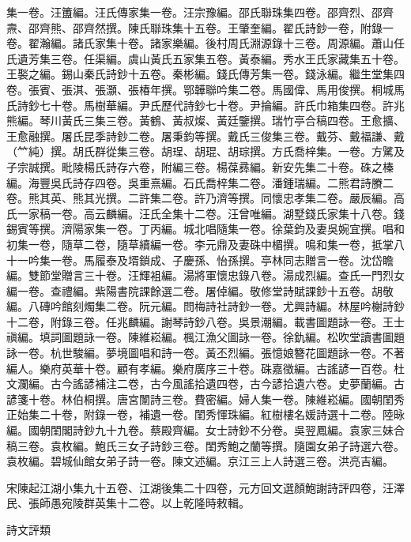 \begin{pinyinscope}
集一卷。汪簠編。汪氏傳家集一卷。汪宗豫編。邵氏聯珠集四卷。邵齊烈、邵齊燾、邵齊熊、邵齊然撰。陳氏聯珠集十五卷。王肇奎編。翟氏詩鈔一卷，附錄一卷。翟瀚編。諸氏家集十卷。諸家樂編。後村周氏淵源錄十三卷。周源編。蕭山任氏遺芳集三卷。任渠編。虞山黃氏五家集五卷。黃泰編。秀水王氏家藏集五十卷。王褧之編。錫山秦氏詩鈔十五卷。秦彬編。錢氏傳芳集一卷。錢泳編。繼生堂集四卷。張賓、張淇、張灝、張椿年撰。鄂韡聯吟集二卷。馬國偉、馬用俊撰。桐城馬氏詩鈔七十卷。馬樹華編。尹氏歷代詩鈔七十卷。尹掄編。許氏巾箱集四卷。許兆熊編。琴川黃氏三集三卷。黃鶴、黃叔燦、黃廷鑒撰。瑞竹亭合稿四卷。王愈擴、王愈融撰。屠氏昆季詩鈔二卷。屠秉鈞等撰。戴氏三俊集三卷。戴芬、戴福謙、戴（𥫗純）撰。胡氏群從集三卷。胡珵、胡琨、胡琮撰。方氏喬梓集。一卷。方騭及子宗誠撰。毗陵楊氏詩存六卷，附編三卷。楊葆彞編。新安先集二十卷。硃之榛編。海豐吳氏詩存四卷。吳重熹編。石氏喬梓集二卷。潘鍾瑞編。二熊君詩賸二卷。熊其英、熊其光撰。二許集二卷。許乃濟等撰。同懷忠孝集二卷。嚴辰編。高氏一家稿一卷。高云麟編。汪氏全集十二卷。汪曾唯編。湖墅錢氏家集十八卷。錢錫賓等撰。濟陽家集一卷。丁丙編。城北唱隨集一卷。徐葉鈞及妻吳婉宜撰。唱和初集一卷，隨草二卷，隨草續編一卷。李元鼎及妻硃中楣撰。鳴和集一卷，抵掌八十一吟集一卷。馬履泰及壻鎖成、子慶孫、怡孫撰。亭林同志贈言一卷。沈岱瞻編。雙節堂贈言三十卷。汪輝袓編。湯將軍懷忠錄八卷。湯成烈編。查氏一門烈女編一卷。查禮編。紫陽書院課餘選二卷。屠倬編。敬修堂詩賦課鈔十五卷。胡敬編。八磚吟館刻燭集二卷。阮元編。問梅詩社詩鈔一卷。尤興詩編。林屋吟榭詩鈔十二卷，附錄三卷。任兆麟編。謝琴詩鈔八卷。吳景潮編。載書圖題詠一卷。王士禛編。填詞圖題詠一卷。陳維崧編。楓江漁父圖詠一卷。徐釚編。松吹堂讀書圖題詠一卷。杭世駿編。夢境圖唱和詩一卷。黃丕烈編。張憶娘簪花圖題詠一卷。不著編人。樂府英華十卷。顧有孝編。樂府廣序三十卷。硃嘉徵編。古謠諺一百卷。杜文瀾編。古今謠諺補注二卷，古今風謠拾遺四卷，古今諺拾遺六卷。史夢蘭編。古諺箋十卷。林伯桐撰。唐宮闈詩三卷。費密編。婦人集一卷。陳維崧編。國朝閨秀正始集二十卷，附錄一卷，補遺一卷。閨秀惲珠編。紅樹樓名媛詩選十二卷。陸昹編。國朝閨閣詩鈔九十九卷。蔡殿齊編。女士詩鈔不分卷。吳翌鳳編。袁家三妹合稿三卷。袁枚編。鮑氏三女子詩鈔三卷。閨秀鮑之蘭等撰。隨園女弟子詩選六卷。袁枚編。碧城仙館女弟子詩一卷。陳文述編。京江三上人詩選三卷。洪亮吉編。

宋陳起江湖小集九十五卷、江湖後集二十四卷，元方回文選顏鮑謝詩評四卷，汪澤民、張師愚宛陵群英集十二卷。以上乾隆時敕輯。

詩文評類


\end{pinyinscope}
